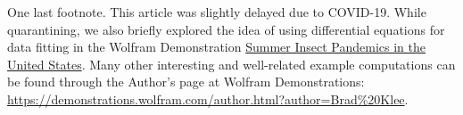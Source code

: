\documentclass[nofootinbib,preprint]{revtex4-1}
\begin{document}
\begin{appendices}
One last footnote. This article was slightly delayed due to COVID-19. While quarantining, we 
also briefly explored the idea of using differential equations for data fitting in the Wolfram 
Demonstration \href{https://demonstrations.wolfram.com/SummerInsectPandemicsInTheUnitedStates/}{Summer 
Insect Pandemics in the United States}. Many other interesting and well-related example
computations can be found through the Author's page at Wolfram Demonstrations:
\href{https://demonstrations.wolfram.com/author.html?author=Brad\%20Klee}{https://demonstrations.wolfram.com/author.html?author=Brad\%20Klee}.

\end{appendices} 
\end{document}
